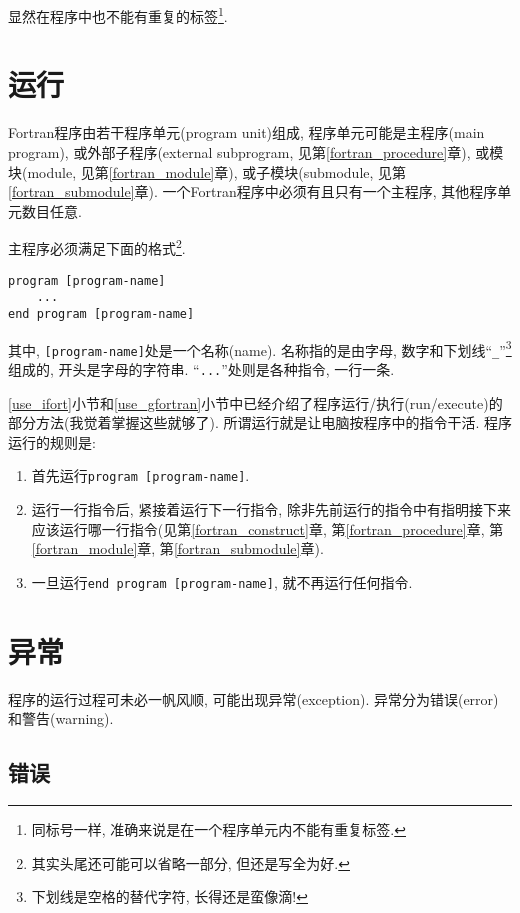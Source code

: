 显然在程序中也不能有重复的标签\footnote{
    同标号一样, 准确来说是在一个程序单元内不能有重复标签.
}.

\section{运行}\label{run_fortran}

Fortran程序由若干程序单元(program unit)组成, 程序单元可能是主程序(main program), 或外部子程序(external subprogram, 见第\ref{fortran_procedure}章), 或模块(module, 见第\ref{fortran_module}章), 或子模块(submodule, 见第\ref{fortran_submodule}章). 一个Fortran程序中必须有且只有一个主程序, 其他程序单元数目任意.

主程序必须满足下面的格式\footnote{
    其实头尾还可能可以省略一部分, 但还是写全为好.
}.
\begin{lstlisting}
program [program-name]
    ...
end program [program-name]
\end{lstlisting}
其中, \texttt{[program-name]}处是一个名称(name). 名称指的是由字母, 数字和下划线``\texttt{\_{}}''\footnote{
    下划线是空格的替代字符, 长得还是蛮像滴!
}组成的, 开头是字母的字符串. ``\texttt{...}''处则是各种指令, 一行一条.

\ref{use_ifort}小节和\ref{use_gfortran}小节中已经介绍了程序运行/执行(run/execute)的部分方法(我觉着掌握这些就够了). 所谓运行就是让电脑按程序中的指令干活. 程序运行的规则是:
\begin{enumerate}
    \item 首先运行\texttt{program [program-name]}.
    \item 运行一行指令后, 紧接着运行下一行指令, 除非先前运行的指令中有指明接下来应该运行哪一行指令(见第\ref{fortran_construct}章, 第\ref{fortran_procedure}章, 第\ref{fortran_module}章, 第\ref{fortran_submodule}章).
    \item 一旦运行\texttt{end program [program-name]}, 就不再运行任何指令.
\end{enumerate}

\section{异常}\label{fortran_exception}

程序的运行过程可未必一帆风顺, 可能出现异常(exception). 异常分为错误(error)和警告(warning).

\subsection{错误}\label{fortran_error}

